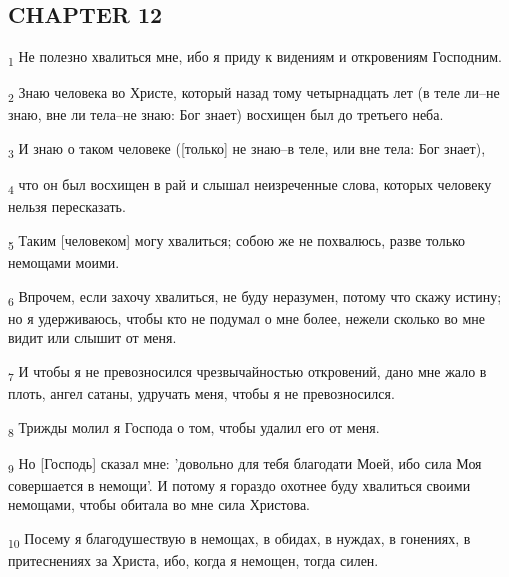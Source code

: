 \subsection{CHAPTER 12}
\begin{tcolorbox}
\textsubscript{1} Не полезно хвалиться мне, ибо я приду к видениям и откровениям Господним.
\end{tcolorbox}
\begin{tcolorbox}
\textsubscript{2} Знаю человека во Христе, который назад тому четырнадцать лет (в теле ли--не знаю, вне ли тела--не знаю: Бог знает) восхищен был до третьего неба.
\end{tcolorbox}
\begin{tcolorbox}
\textsubscript{3} И знаю о таком человеке ([только] не знаю--в теле, или вне тела: Бог знает),
\end{tcolorbox}
\begin{tcolorbox}
\textsubscript{4} что он был восхищен в рай и слышал неизреченные слова, которых человеку нельзя пересказать.
\end{tcolorbox}
\begin{tcolorbox}
\textsubscript{5} Таким [человеком] могу хвалиться; собою же не похвалюсь, разве только немощами моими.
\end{tcolorbox}
\begin{tcolorbox}
\textsubscript{6} Впрочем, если захочу хвалиться, не буду неразумен, потому что скажу истину; но я удерживаюсь, чтобы кто не подумал о мне более, нежели сколько во мне видит или слышит от меня.
\end{tcolorbox}
\begin{tcolorbox}
\textsubscript{7} И чтобы я не превозносился чрезвычайностью откровений, дано мне жало в плоть, ангел сатаны, удручать меня, чтобы я не превозносился.
\end{tcolorbox}
\begin{tcolorbox}
\textsubscript{8} Трижды молил я Господа о том, чтобы удалил его от меня.
\end{tcolorbox}
\begin{tcolorbox}
\textsubscript{9} Но [Господь] сказал мне: 'довольно для тебя благодати Моей, ибо сила Моя совершается в немощи'. И потому я гораздо охотнее буду хвалиться своими немощами, чтобы обитала во мне сила Христова.
\end{tcolorbox}
\begin{tcolorbox}
\textsubscript{10} Посему я благодушествую в немощах, в обидах, в нуждах, в гонениях, в притеснениях за Христа, ибо, когда я немощен, тогда силен.
\end{tcolorbox}
